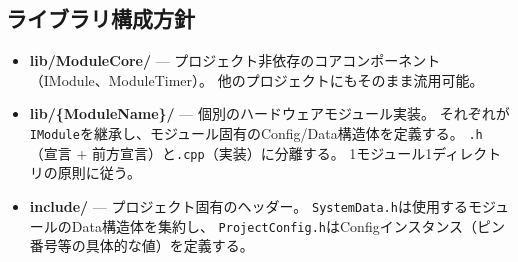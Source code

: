 \subsection{ライブラリ構成方針}

\begin{itemize}
    \item \textbf{lib/ModuleCore/} — プロジェクト非依存のコアコンポーネント（IModule、ModuleTimer）。
    他のプロジェクトにもそのまま流用可能。
    \item \textbf{lib/\{ModuleName\}/} — 個別のハードウェアモジュール実装。
    それぞれが\texttt{IModule}を継承し、モジュール固有のConfig/Data構造体を定義する。
    \texttt{.h}（宣言 + 前方宣言）と\texttt{.cpp}（実装）に分離する。
    1モジュール1ディレクトリの原則に従う。
    \item \textbf{include/} — プロジェクト固有のヘッダー。
    \texttt{SystemData.h}は使用するモジュールのData構造体を集約し、
    \texttt{ProjectConfig.h}はConfigインスタンス（ピン番号等の具体的な値）を定義する。
\end{itemize}
